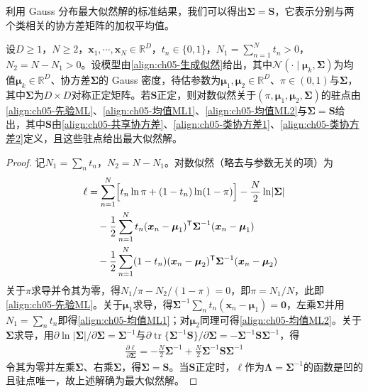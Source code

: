 \documentclass[../../main.tex]{subfiles}
\begin{document}
利用 Gauss 分布最大似然解的标准结果，我们可以得出$\boldsymbol{\Sigma}=\boldsymbol{S}$，它表示分别与两个类相关的协方差矩阵的加权平均值。

\begin{proposition}[生成式模型的最大似然解]\label{proposition:ch05-生成模型最大似然解}
设$D\geqslant1$，$N\geqslant2$，$\boldsymbol{x}_1,\cdots,\boldsymbol{x}_N\in\mathbb{R}^{D}$，$t_n\in\{0,1\}$，$N_1=\sum_{n=1}^{N}t_n>0$，$N_2=N-N_1>0$。设模型由\eqref{align:ch05-生成似然}给出，其中$\mathcal{N}(\cdot\mid\boldsymbol{\mu}_k,\boldsymbol{\Sigma})$为均值$\boldsymbol{\mu}_k\in\mathbb{R}^{D}$、协方差$\boldsymbol{\Sigma}$的 Gauss 密度，待估参数为$\boldsymbol{\mu}_1,\boldsymbol{\mu}_2\in\mathbb{R}^{D}$、$\pi\in(0,1)$与$\boldsymbol{\Sigma}$，其中$\boldsymbol{\Sigma}$为$D\times D$对称正定矩阵。若$\boldsymbol{S}$正定，则对数似然关于$(\pi,\boldsymbol{\mu}_1,\boldsymbol{\mu}_2,\boldsymbol{\Sigma})$的驻点由\eqref{align:ch05-先验ML}、\eqref{align:ch05-均值ML1}、\eqref{align:ch05-均值ML2}与$\boldsymbol{\Sigma}=\boldsymbol{S}$给出，其中$\boldsymbol{S}$由\eqref{align:ch05-共享协方差}、\eqref{align:ch05-类协方差1}、\eqref{align:ch05-类协方差2}定义，且这些驻点给出最大似然解。
\end{proposition}

\begin{proof}
记$N_1=\sum_n t_n$，$N_2=N-N_1$。对数似然（略去与参数无关的项）为
\begin{align}
  \ell&=\sum_{n=1}^{N}\Bigl[t_n\ln\pi+(1-t_n)\ln(1-\pi)\Bigr]-\frac{N}{2}\ln\lvert\boldsymbol{\Sigma}\rvert
  \nonumber\\
  &\quad-\frac{1}{2}\sum_{n=1}^{N}t_n(\boldsymbol{x}_n-\boldsymbol{\mu}_1)^{\mathsf{T}}\boldsymbol{\Sigma}^{-1}(\boldsymbol{x}_n-\boldsymbol{\mu}_1)
  \nonumber\\
  &\quad-\frac{1}{2}\sum_{n=1}^{N}(1-t_n)(\boldsymbol{x}_n-\boldsymbol{\mu}_2)^{\mathsf{T}}\boldsymbol{\Sigma}^{-1}(\boldsymbol{x}_n-\boldsymbol{\mu}_2)
\end{align}
关于$\pi$求导并令其为零，得$N_1/\pi-N_2/(1-\pi)=0$，即$\pi=N_1/N$，此即\eqref{align:ch05-先验ML}。关于$\boldsymbol{\mu}_1$求导，得$\boldsymbol{\Sigma}^{-1}\sum_n t_n(\boldsymbol{x}_n-\boldsymbol{\mu}_1)=\boldsymbol{0}$，左乘$\boldsymbol{\Sigma}$并用$N_1=\sum_n t_n$即得\eqref{align:ch05-均值ML1}；对$\boldsymbol{\mu}_2$同理可得\eqref{align:ch05-均值ML2}。关于$\boldsymbol{\Sigma}$求导，用$\partial\ln\lvert\boldsymbol{\Sigma}\rvert/\partial\boldsymbol{\Sigma}=\boldsymbol{\Sigma}^{-1}$与$\partial\operatorname{tr}\{\boldsymbol{\Sigma}^{-1}\boldsymbol{S}\}/\partial\boldsymbol{\Sigma}=-\boldsymbol{\Sigma}^{-1}\boldsymbol{S}\boldsymbol{\Sigma}^{-1}$，得
\begin{align}
  \frac{\partial\ell}{\partial\boldsymbol{\Sigma}}=-\frac{N}{2}\boldsymbol{\Sigma}^{-1}+\frac{N}{2}\boldsymbol{\Sigma}^{-1}\boldsymbol{S}\boldsymbol{\Sigma}^{-1}
\end{align}
令其为零并左乘$\boldsymbol{\Sigma}$、右乘$\boldsymbol{\Sigma}$，得$\boldsymbol{\Sigma}=\boldsymbol{S}$。当$\boldsymbol{S}$正定时，$\ell$作为$\boldsymbol{\Lambda}=\boldsymbol{\Sigma}^{-1}$的函数是凹的且驻点唯一，故上述解确为最大似然解。
\end{proof}
\end{document}

